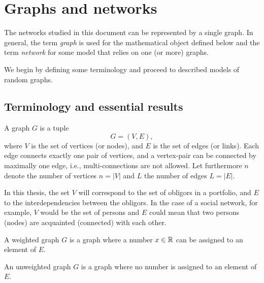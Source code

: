 \chapter{Graphs and networks} %
\label{cha:graphs_and_networks}



The networks studied in this document can be represented by a single graph.
In general, the term \textit{graph} is used for the mathematical object defined below and the term \textit{network} for some model that relies on one (or more) graphs.

We begin by defining some terminology and proceed to described models of random graphs.

\section{Terminology and essential results} %
\label{sec:definitions_and_essential_results}

\begin{definition}A graph $G$ is a tuple
\begin{equation}
G = (V,E),
\end{equation}
\noindent where $V$ is the set of vertices (or nodes), and $E$ is the set of edges (or links).
Each edge connects exactly one pair of vertices, and a vertex-pair can be connected by maximally one edge, i.e., multi-connections are not allowed.
Let furthermore $n$ denote the number of vertices $n = |V|$ and $L$ the number of edges $L = |E|$.
\end{definition}


In this thesis, the set $V$ will correspond to the set of obligors in a portfolio, and $E$ to the interdependencies between the obligors.
In the case of a social network, for example, $V$ would be the set of persons and $E$ could mean that two persons (nodes) are acquainted (connected) with each other.

\begin{definition}A weighted graph $G$ is a graph where a number $x \in {\mathbb R}$ can be assigned to an element of $E$.\end{definition}

\begin{definition}An unweighted graph $G$ is a graph where no number is assigned to an element of $E$.\end{definition}


